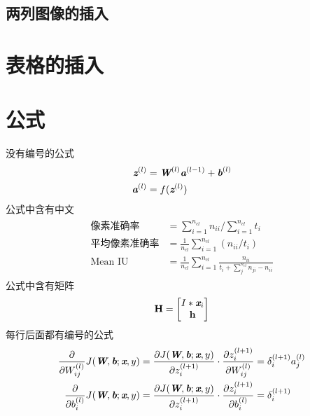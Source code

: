 \subsection{两列图像的插入}
\label{sec:complex}


\clearpage

\section{表格的插入}
\label{sec:tables}



\section{公式}
\label{sec:formula}
没有编号的公式
\begin{align*}
\begin{split}
	\label{eq:feedforward}
	\textit{\textbf{z}}^{(l)} & = \textit{\textbf{W}}^{(l)}\textit{\textbf{a}}^{(l-1)} + \textit{\textbf{b}}^{(l)} \\
	\textit{\textbf{a}}^{(l)} & = f(\textit{\textbf{z}}^{(l)})
\end{split}
\end{align*}
公式中含有中文
\begin{align}
	\begin{split}
	\mbox{像素准确率} &= \sum_{i=1}^{n_{cl}}n_{ii} / \sum_{i=1}^{n_{cl}}t_i \\
		\mbox{平均像素准确率} &= \frac{1}{n_{cl}} \sum_{i=1}^{n_{cl}}(n_{ii}/ t_i) \\
	\mbox{Mean IU} &= \frac{1}{n_{cl}} \sum_{i=1}^{n_{cl}}\frac{n_{ii}}{t_i + \sum_j^{n_{cl}} n_{ji} - n_{ii}}
	\end{split}
\end{align}
公式中含有矩阵
\begin{equation}
	\textbf{H} = \begin{bmatrix}
		I*\textit{\textbf{x}}_i \\ \textbf{h}
	\end{bmatrix}
\end{equation}
每行后面都有编号的公式
\begin{align}
	\frac{\partial}{\partial W_{ij}^{(l)}} J(\textit{\textbf{W}},\textit{\textbf{b}};\textit{\textbf{x}},y) &= \frac{\partial J(\textit{\textbf{W}},\textit{\textbf{b}};\textit{\textbf{x}},y)}{\partial z_i^{(l+1)}}\cdot \frac{\partial z_i^{(l+1)}}{\partial W_{ij}^{(l)}} = \delta_i^{(l+1)}a_j^{(l)} \\
	\frac{\partial}{\partial b_i^{(l)}} J(\textit{\textbf{W}},\textit{\textbf{b}};\textit{\textbf{x}},y) &= \frac{\partial J(\textit{\textbf{W}},\textit{\textbf{b}};\textit{\textbf{x}},y)}{\partial z_i^{(l+1)}}\cdot \frac{\partial z_i^{(l+1)}}{\partial b_i^{(l)}} = \delta_i^{(l+1)}
\end{align}

